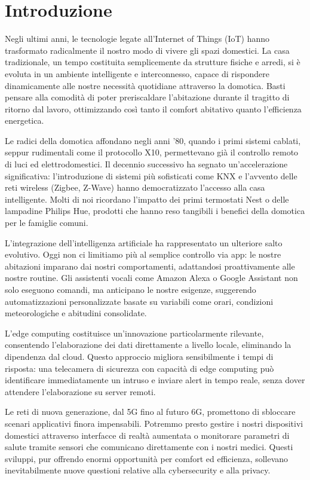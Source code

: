 \chapter{Introduzione}
Negli ultimi anni, le tecnologie legate all'Internet of Things (IoT) hanno trasformato radicalmente il nostro modo di vivere gli spazi domestici. La casa tradizionale, un tempo costituita semplicemente da strutture fisiche e arredi, si è evoluta in un ambiente intelligente e interconnesso, capace di rispondere dinamicamente alle nostre necessità quotidiane attraverso la domotica. Basti pensare alla comodità di poter preriscaldare l'abitazione durante il tragitto di ritorno dal lavoro, ottimizzando così tanto il comfort abitativo quanto l'efficienza energetica.

\vspace{0.5cm}
Le radici della domotica affondano negli anni '80, quando i primi sistemi cablati, seppur rudimentali come il protocollo X10, permettevano già il controllo remoto di luci ed elettrodomestici. Il decennio successivo ha segnato un'accelerazione significativa: l'introduzione di sistemi più sofisticati come KNX e l'avvento delle reti wireless (Zigbee, Z-Wave) hanno democratizzato l'accesso alla casa intelligente. Molti di noi ricordano l'impatto dei primi termostati Nest o delle lampadine Philips Hue, prodotti che hanno reso tangibili i benefici della domotica per le famiglie comuni.

\vspace{0.5cm}
L'integrazione dell'intelligenza artificiale ha rappresentato un ulteriore salto evolutivo. Oggi non ci limitiamo più al semplice controllo via app: le nostre abitazioni imparano dai nostri comportamenti, adattandosi proattivamente alle nostre routine. Gli assistenti vocali come Amazon Alexa o Google Assistant non solo eseguono comandi, ma anticipano le nostre esigenze, suggerendo automatizzazioni personalizzate basate su variabili come orari, condizioni meteorologiche e abitudini consolidate.

\vspace{0.5cm}
L'edge computing costituisce un'innovazione particolarmente rilevante, consentendo l'elaborazione dei dati direttamente a livello locale, eliminando la dipendenza dal cloud. Questo approccio migliora sensibilmente i tempi di risposta: una telecamera di sicurezza con capacità di edge computing può identificare immediatamente un intruso e inviare alert in tempo reale, senza dover attendere l'elaborazione su server remoti.


\vspace{0.5cm}
Le reti di nuova generazione, dal 5G fino al futuro 6G, promettono di sbloccare scenari applicativi finora impensabili. Potremmo presto gestire i nostri dispositivi domestici attraverso interfacce di realtà aumentata o monitorare parametri di salute tramite sensori che comunicano direttamente con i nostri medici. Questi sviluppi, pur offrendo enormi opportunità per comfort ed efficienza, sollevano inevitabilmente nuove questioni relative alla cybersecurity e alla privacy.

